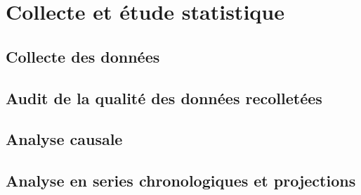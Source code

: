\chapter{Collecte et étude statistique}

\cleardoublepage

	\section{Collecte des données}
	\section{Audit de la qualité des données recolletées}
	\section{Analyse causale}
	\section{Analyse en series chronologiques et projections}